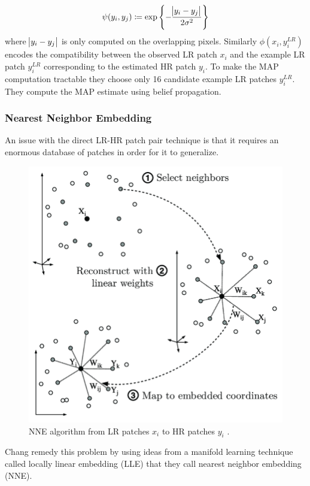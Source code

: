 \begin{equation}
    \psi(y_i, y_j) \coloneqq \exp \left\{ -  \frac{\abs{ y_i - y_j }}{2\sigma^2} \right\}
\end{equation}
where \(\abs{ y_i - y_j }\) is only computed on the overlapping pixels.
%
Similarly \(\phi(x_i, y_i^{LR})\) encodes the compatibility between the observed LR patch \(x_i\) and the example LR patch \(y_i^{LR}\) corresponding to the estimated HR patch \(y_i\).
%
To make the MAP computation tractable they choose only 16 candidate example LR patches \(y_i^{LR}\).
%
They compute the MAP estimate using belief propagation.

\subsubsection{Nearest Neighbor Embedding}
An issue with the direct LR-HR patch pair technique is that it requires an enormous database of patches in order for it to generalize.
%
\begin{figure}[!htbp]
    \centering
    \includegraphics[width=\linewidth,keepaspectratio]{figures/classical/lle.png}
    \caption{NNE algorithm from LR patches \(x_i\) to HR patches \(y_i\) \cite{Guillermophdthesis}.}
    \label{fig:lle}
\end{figure}
Chang \etal remedy this problem by using ideas from a manifold learning technique called locally linear embedding \cite{saul2000introduction} (LLE) that they call nearest neighbor embedding (NNE).
